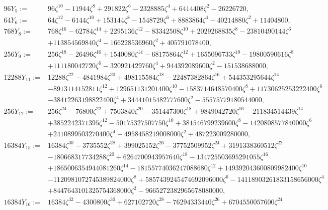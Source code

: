 \documentclass[11pt,a4paper]{article}
\numberwithin{equation}{section}
\begin{document}
{\begin{appendices}
\begin{align*}
96Y_{5}:=&96 \zeta ^{10}-11944 \zeta ^8+291822 \zeta ^6-2328885 \zeta ^4+6414408 \zeta ^2-26226720,\\
64Y_{6}:=&64 \zeta ^{12}-6144 \zeta ^{10}+153144 \zeta ^8-1548729 \zeta ^6+8883864 \zeta ^4-40214880 \zeta ^2+11404800,\\
768Y_{8}:=&768 \zeta ^{16}-62784 \zeta ^{14}+2295136 \zeta ^{12}-83342508 \zeta ^{10}+2029268835 \zeta ^8-23810490144 \zeta ^6\\
&+113854569840 \zeta ^4-166228536960 \zeta ^2+405791078400,\\
256Y_{9}:=&256 \zeta ^{18}-26496 \zeta ^{16}+1540080 \zeta ^{14}-68175864 \zeta ^{12}+1655096733 \zeta ^{10}-19800590616 \zeta ^8\\
&+111180042720 \zeta ^6-320921429760 \zeta ^4+944392089600 \zeta ^2-151538688000,\\
12288Y_{11}:=&12288\zeta^{22}-4841984 \zeta ^{20}+498115584 \zeta ^{18}-22487382864 \zeta ^{16}+544353295644 \zeta ^{14}\nonumber\\
&-8913114152811 \zeta ^{12}+129651131201400 \zeta ^{10}-1583714648570400 \zeta ^8+11730625253222400 \zeta ^6\nonumber\\
&-38412263198822400 \zeta ^4+34441015482777600 \zeta ^2-55575779180544000,\\
256Y_{12}:=&256\zeta ^{24}-76800 \zeta ^{22}+7503840 \zeta ^{20}-351447300 \zeta ^{18}+9849042720 \zeta ^{16}-211834514439 \zeta ^{14}\nonumber\\
&+3852242371395 \zeta ^{12}-50175327507750 \zeta ^{10}+381546799239600 \zeta ^8-1420808577840000 \zeta ^6\nonumber\\
&+2410899503270400 \zeta ^4-4958458219008000 \zeta ^2+487223009280000,\\
16384Y_{15}:=&16384\zeta ^{30}-3735552 \zeta ^{28}+399025152 \zeta ^{26}-37752509952 \zeta ^{24}+3191338360512 \zeta ^{22}\nonumber\\
&-180668317734288 \zeta ^{20}+6264700943957640 \zeta ^{18}-134725503695291055 \zeta ^{16}\nonumber\\
&+1865006354944081260 \zeta ^{14}-18155774036247088680 \zeta ^{12}+149392043600809982400 \zeta ^{10}\nonumber\\
&-1120981072745389824000 \zeta ^8+5857439245474692096000 \zeta ^6-14118903261833158656000 \zeta ^4\nonumber\\
&+8447643101325754368000 \zeta ^2-9665272382965678080000,\\
16384Y_{16}:=&16384 \zeta ^{32}-4300800 \zeta ^{30}+627102720 \zeta ^{28}-76294333440 \zeta ^{26}+6704550057600 \zeta ^{24}\nonumber\\

\end{align*}
\end{appendices}}
\end{document}
